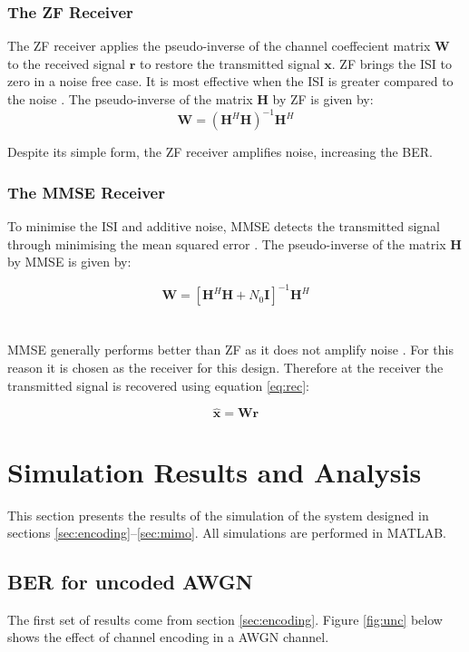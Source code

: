 \documentclass[11pt]{report}
\renewcommand{\vec}[1]{\mathbf{#1}} %
\begin{document}
\subsubsection{The ZF Receiver}
\label{subsub:zf}
The ZF receiver applies the pseudo-inverse of the channel coeffecient matrix $\vec{W}$ to the received signal $\vec{r}$ to restore the transmitted signal $\vec{x}$. ZF brings the ISI to zero in a noise free case. It is most effective when the ISI is greater compared to the noise \cite{46}. The pseudo-inverse of the matrix $\vec{H}$  by ZF is given by:
\begin{equation}
\label{eq:zf}
\vec{W} = (\vec{H}^H\vec{H})^{-1}\vec{H}^H
\end{equation}

Despite its simple form, the ZF receiver amplifies noise, increasing the BER.

\subsubsection{The MMSE Receiver}
\label{subsub:mmse}
To minimise the ISI and additive noise, MMSE detects the transmitted signal through minimising the mean squared error \cite{B9}. The pseudo-inverse of the matrix $\vec{H}$ by MMSE is given by:

\begin{equation}
\label{eq:mmse}
\vec{W} = [\vec{H}^H\vec{H} + N_0\vec{I}]^{-1}\vec{H}^H
\end{equation}
\\
\\
MMSE generally performs better than ZF as it does not amplify noise \cite{46}. For this reason it is chosen as the receiver for this design. Therefore at the receiver the transmitted signal is recovered using equation \ref{eq:rec}:

\begin{equation}
	\label{eq:rec}
	\vec{\hat{x}} = \vec{W}\vec{r}
\end{equation}

\section{Simulation Results and Analysis}
\label{sec:results}
This section presents the results of the simulation of the system designed in sections \ref{sec:encoding}--\ref{sec:mimo}. All simulations are performed in MATLAB.

\subsection{BER for uncoded AWGN}
The first set of results come from section \ref{sec:encoding}. Figure \ref{fig:unc} below shows the effect of channel encoding in a AWGN channel.
\end{document}
